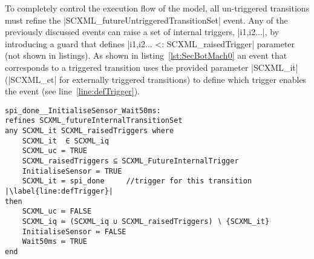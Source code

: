 To completely control the execution flow of the model, all un-triggered transitions must refine the |SCXML_futureUntriggeredTransitionSet| event. 
Any of the previously discussed events can raise a set of internal triggers, |{i1,i2...}|, by introducing a guard that defines |{i1,i2...} <: SCXML_raisedTrigger| parameter (not shown in listings). 
As shown in listing~\ref{lst:SecBotMach0} an event that corresponds to a triggered transition uses the provided parameter |SCXML_it| (|SCXML_et| for externally triggered transitions) to define which trigger enables the event (see line~\ref{line:defTrigger}).

\begin{lstlisting}[caption={Event-B event corresponding to internal triggered transition to \textbf{Wait50ms} state in refinement level 1 shown in Fig.~\ref{fig:ASIC}}, label={lst:SecBotMach0},language=Event-B, escapechar=|, frame=single]
spi_done__InitialiseSensor_Wait50ms:	
refines SCXML_futureInternalTransitionSet 
any SCXML_it SCXML_raisedTriggers where
	SCXML_it  ∈ SCXML_iq 
	SCXML_uc = TRUE
	SCXML_raisedTriggers ⊆ SCXML_FutureInternalTrigger
	InitialiseSensor = TRUE
	SCXML_it = spi_done  	//trigger for this transition |\label{line:defTrigger}|
then
	SCXML_uc ≔ FALSE
	SCXML_iq ≔ (SCXML_iq ∪ SCXML_raisedTriggers) ∖ {SCXML_it}
	InitialiseSensor ≔ FALSE
	Wait50ms ≔ TRUE
end
\end{lstlisting}

